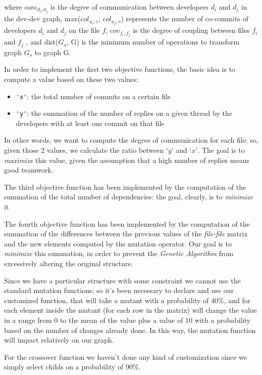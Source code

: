 \documentclass[sigconf]{acmart}
\begin{document}
where $com_{d_i,d_j}$ is the degree of communication between developers $d_i$ and $d_j$ in the dev-dev graph, max($col_{u_i;v}$; $col_{u_j;v}$) represents the number of co-commits of developers $d_i$ and $d_j$ on the file $f$, $cov_{f_i,f_j}$ is the degree of coupling between files $f_i$ and $f_j$ , and dist($G_s$, G) is the minimum number of operations to transform graph $G_s$ to graph G.

In order to implement the first two objective functions, the basic idea is to compute a value based on these two values:

\begin{itemize}
\item {\verb|'x'|}: the total number of commits on a certain file
\item {\verb|'y'|}: the summation of the number of replies on a given thread by the developers with at least one commit on that file
\end{itemize}

In other words, we want to compute the degree of communication for each file: so, given those 2 values, we calculate the ratio between $‘y’$ and $‘x’$.
The goal is to \textit{maximize} this value, given the assumption that a high number of replies means good teamwork.

The third objective function has been implemented by the computation of the summation of the total number of dependencies: the goal, clearly, is to \textit{minimize} it

The fourth objective function has been implemented by the computation of the summation of the differences between the previous values of the {\itshape file-file} matrix and the new elements computed by the mutation operator. Our goal is to \textit{minimize} this summation, in order to prevent the {\itshape Genetic Algorithm} from excessively altering the original structure.

Since we have a particular structure with some constraint we cannot use the standard mutation functions; so it’s been necessary to declare and use our customized function, that will take a mutant with a probability of 40\%, and for each element inside the mutant (for each row in the matrix) will change the value in a range from 0 to the mean of the value plus a value of 10 with a probability based on the number of changes already done.
In this way, the mutation function will impact relatively on our graph.

For the crossover function we haven’t done any kind of customization since we simply select childs on a probability of 90\%.
\end{document}
